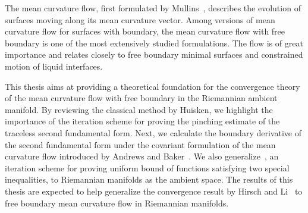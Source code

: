 
The mean curvature flow, first formulated by Mullins~\cite{mullins_twodimensional_1956}, describes the evolution of surfaces moving along its mean curvature vector. Among versions of mean curvature flow for surfaces with boundary, the mean curvature flow with free boundary is one of the most extensively studied formulations. The flow is of great importance and relates closely to free boundary minimal surfaces and constrained motion of liquid interfaces.

This thesis aims at providing a theoretical foundation for the convergence theory of the mean curvature flow with free boundary in the Riemannian ambient manifold. By reviewing the classical method by Huisken\cite{huisken_flow_1984}, we highlight the importance of the iteration scheme for proving the pinching estimate of the traceless second fundamental form. Next, we calculate the boundary derivative of the second fundamental form under the covariant formulation of the mean curvature flow introduced by Andrews and Baker~\cite{andrews_mean_2010}. We also generalize~\cite[Theorem 3.1]{edelen_convexity_2016}, an iteration scheme for proving uniform bound of functions satisfying two special inequalities, to Riemannian manifolds as the ambient space. The results of this thesis are expected to help generalize the convergence result by Hirsch and Li~\cite{hirsch2020contracting} to free boundary mean curvature flow in Riemannian manifolds.


